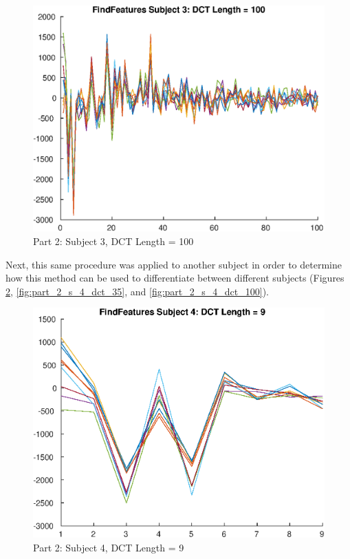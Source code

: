 \documentclass[conference]{IEEEtran}
\begin{document}
  \begin{figure}[H]
    \centering
    \includegraphics[scale=0.5]{./img/part_2_s_3_dct_100.eps}
    \caption{Part 2: Subject 3, DCT Length = 100}
    \label{fig:part_2_s_3_dct_100}
  \end{figure}


  Next, this same procedure was applied to another subject in order to determine
  how this method can be used to differentiate between different subjects (Figures
  \ref{fig:part_2_s_4_dct_9}, \ref{fig:part_2_s_4_dct_35}, and
  \ref{fig:part_2_s_4_dct_100}).

  \begin{figure}[H]
    \centering
    \includegraphics[scale=0.5]{./img/part_2_s_4_dct_9.eps}
    \caption{Part 2: Subject 4, DCT Length = 9}
    \label{fig:part_2_s_4_dct_9}
  \end{figure}
\end{document}

